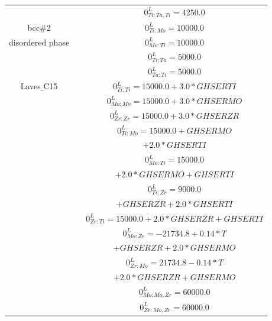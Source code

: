 \begin{longtable}[H]{ c c c }
                        & \cite{Ansara1998} & $0^\textit{L}_{Ti:Ta,Ti} = 4250.0$\\
      bcc\#2 & \cite{Ansara1998} & $0^\textit{L}_{Ti:Mo} = 10000.0$\\
  disordered phase & \cite{Ansara1998} & $0^\textit{L}_{Mo:Ti} = 10000.0$\\
                              & \cite{Ansara1998} & $0^\textit{L}_{Ti:Ta} = 5000.0$\\
                              & \cite{Ansara1998} & $0^\textit{L}_{Ta:Ti} = 5000.0$\\
       Laves$\_$C15 & \cite{Kar2008} & $0^\textit{L}_{Ti:Ti} = 15000.0+3.0*GHSERTI$\\
                               & \cite{Perez2003} & $0^\textit{L}_{Mo:Mo} = 15000.0+3.0*GHSERMO$\\
                               & \cite{Perez2003}  & $0^\textit{L}_{Zr:Zr} = 15000.0+3.0*GHSERZR$\\
                               & \cite{Kar2008} & $0^\textit{L}_{Ti:Mo} = 15000.0+GHSERMO$\\
                               &                        & $+2.0*GHSERTI$\\
                               & \cite{Kar2008} & $0^\textit{L}_{Mo:Ti} = 15000.0$\\
                               &                        & $+2.0*GHSERMO+GHSERTI$\\
                               & \cite{Kar2008} & $0^\textit{L}_{Ti:Zr} = 9000.0$\\
                               &                        & $+GHSERZR+2.0*GHSERTI$\\
                               & \cite{Kar2008} & $0^\textit{L}_{Zr:Ti} = 15000.0+2.0*GHSERZR+GHSERTI$\\
                               & \cite{Perez2003}  & $0^\textit{L}_{Mo:Zr} = -21734.8+0.14*T$\\
                               &                             & $+GHSERZR+2.0*GHSERMO$\\
                               & \cite{Perez2003}  & $0^\textit{L}_{Zr:Mo} = 21734.8-0.14*T$\\
                               &                             & $+2.0*GHSERZR+GHSERMO$\\
                               & \cite{Perez2003} & $0^\textit{L}_{Mo:Mo,Zr} = 60000.0$\\
                               & \cite{Perez2003} & $0^\textit{L}_{Zr:Mo,Zr} = 60000.0$\\

\end{longtable}

